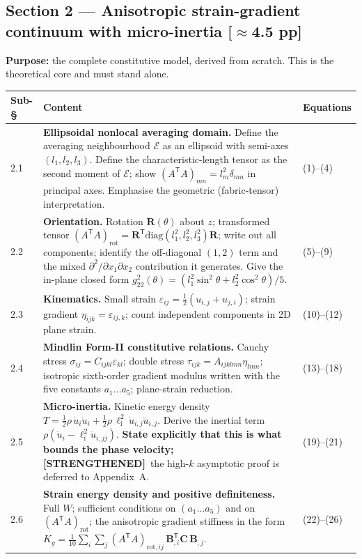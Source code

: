 \documentclass[11pt,a4paper]{article}
\newcommand{\bp}[1]{\textcolor{accent}{\textsf{\footnotesize [#1]}}}
\newcommand{\STR}{{\color{strcol}\textbf{[STRENGTHENED]}}}
\begin{document}
\subsection{Section 2 --- Anisotropic strain-gradient continuum with micro-inertia \bp{$\approx$4.5 pp}}

\textbf{Purpose:} the complete constitutive model, derived from scratch. This is the
theoretical core and must stand alone.

\begin{tabularx}{\textwidth}{@{}L{1.5cm} Y L{3.4cm}@{}}
\toprule
Sub-\S & Content & Equations \\
 & \textbf{Ellipsoidal nonlocal averaging domain.} Define the averaging neighbourhood $\mathcal E$ as an ellipsoid with semi-axes $(l_1,l_2,l_3)$. Define the characteristic-length tensor as the second moment of $\mathcal E$; show $(A^{\mathsf T}\!A)_{mn}=l_m^2\delta_{mn}$ in principal axes. Emphasise the geometric (fabric-tensor) interpretation. & (1)--(4) \\
2.2 & \textbf{Orientation.} Rotation $\bm R(\theta)$ about $z$; transformed tensor $(A^{\mathsf T}\!A)_{\mathrm{rot}}=\bm R^{\mathsf T}\mathrm{diag}(l_1^2,l_2^2,l_3^2)\bm R$; write out all components; identify the off-diagonal $(1,2)$ term and the mixed $\partial^2/\partial x_1\partial x_2$ contribution it generates. Give the in-plane closed form $g_{22}^2(\theta)=(l_1^2\sin^2\theta+l_2^2\cos^2\theta)/5$. & (5)--(9) \\
2.3 & \textbf{Kinematics.} Small strain $\varepsilon_{ij}=\tfrac12(u_{i,j}+u_{j,i})$; strain gradient $\eta_{ijk}=\varepsilon_{ij,k}$; count independent components in 2D plane strain. & (10)--(12) \\
2.4 & \textbf{Mindlin Form-II constitutive relations.} Cauchy stress $\sigma_{ij}=C_{ijkl}\varepsilon_{kl}$; double stress $\tau_{ijk}=A_{ijklmn}\eta_{lmn}$; isotropic sixth-order gradient modulus written with the five constants $a_1\ldots a_5$; plane-strain reduction. & (13)--(18) \\
2.5 & \textbf{Micro-inertia.} Kinetic energy density $T=\tfrac12\rho\,\dot u_i\dot u_i+\tfrac12\rho\,\ell_{\mathrm i}^2\,\dot u_{i,j}\dot u_{i,j}$. Derive the inertial term $\rho(\ddot u_i-\ell_{\mathrm i}^2\ddot u_{i,jj})$. \textbf{State explicitly that this is what bounds the phase velocity;} \STR\ the high-$k$ asymptotic proof is deferred to Appendix~A. & (19)--(21) \\
2.6 & \textbf{Strain energy density and positive definiteness.} Full $W$; sufficient conditions on $(a_1\ldots a_5)$ and on $(A^{\mathsf T}\!A)_{\mathrm{rot}}$; the anisotropic gradient stiffness in the form $K_g=\tfrac{1}{10}\sum_{i}\sum_{j}(A^{\mathsf T}\!A)_{\mathrm{rot},ij}\,\bm B_{,i}^{\mathsf T}\bm C\,\bm B_{,j}$. & (22)--(26) \\

\end{tabularx}
\end{document}

